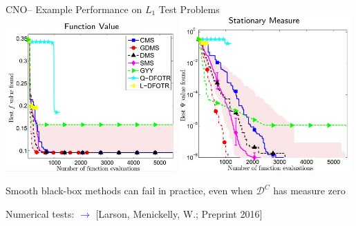 \documentclass[handout,aspectratio=54]{beamer}
\numberwithin{theorem}{section}
\begin{document}
\begin{frame}{CNO– Example Performance on $L_1$ Test Problems}
\includegraphics[width=0.49\textwidth]{fig/55-1.jpg}
\includegraphics[width=0.49\textwidth]{fig/55-2.jpg}

\begin{center}
\small
Smooth black-box methods can fail in practice, even when $\mathcal{D}^C$ has measure zero
\end{center}

\flushright\footnotesize
Numerical tests: \textcolor{blue}{$\rightarrow$}\textcolor[RGB]{128,0,128}{ [Larson, Menickelly, W.; Preprint 2016]}
\end{frame}
\end{document}
